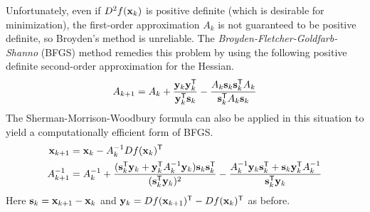 Unfortunately, even if $D^2f(\mathbf{x}_k)$ is positive definite (which is desirable for minimization), the first-order approximation $A_k$ is not guaranteed to be positive definite, so Broyden's method is unreliable.
The \emph{Broyden-Fletcher-Goldfarb-Shanno} (BFGS) method remedies this problem by using the following positive definite second-order approximation for the Hessian.
\[
A_{k+1} = A_k + \frac{\mathbf{y}_k\mathbf{y}_k^{\mathsf T} }{\mathbf{y}_k^{\mathsf T} \mathbf{s}_k}-\frac{A_k\mathbf{s}_k\mathbf{s}_k^{\mathsf T} A_k}{\mathbf{s}_k^{\mathsf T} A_k\mathbf{s}_k}
\]
The Sherman-Morrison-Woodbury formula can also be applied in this situation to yield a computationally efficient form of BFGS.
\begin{align}
\mathbf{x}_{k+1} &= \mathbf{x}_k - A_{k}^{-1}Df(\mathbf{x}_k)^{\mathsf T}
\label{eq:quasinewton-bfgs-iteration}
\\
A_{k+1}^{-1} &= A_k^{-1} + \frac{(\mathbf{s}_k^{\mathsf T} \mathbf{y}_k + \mathbf{y}_k^{\mathsf T} A_k^{-1}\mathbf{y}_k)\mathbf{s}_k\mathbf{s}_k^{\mathsf T} }{(\mathbf{s}_k^{\mathsf T} \mathbf{y}_k)^2} - \frac{A_k^{-1}\mathbf{y}_k\mathbf{s}_k^{\mathsf T}  + \mathbf{s}_k\mathbf{y}_k^{\mathsf T} A_k^{-1}}{\mathbf{s}_k^{\mathsf T} \mathbf{y}_k}
\label{eq:quasinewton-bfgs-hessian}
\end{align}
Here $\mathbf{s}_k = \mathbf{x}_{k+1} - \mathbf{x}_{k}$ and $\mathbf{y}_k = Df(\mathbf{x}_{k+1})^{\mathsf T} - Df(\mathbf{x}_{k})^{\mathsf T}$ as before.

